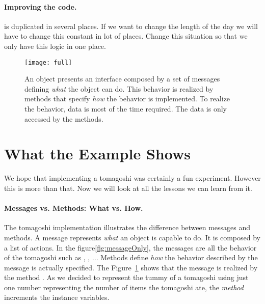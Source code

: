 \paragraph{Improving the code.}  is duplicated in several places. If we want to
 change the length of the day we will have to change this constant in lot of places. Change this
 situation so that we only have this logic in one place. 

\begin{figure}
\begin{center}
\texttt{[image: full]}
\caption{An object presents an interface composed by a set of messages defining \textit{what} the object can do. This behavior is realized by methods that specify \textit{how} the behavior is implemented. To realize the behavior, data is most of the time required. The data is only accessed by the methods. \label{fig:full}}
\end{center}
\end{figure}


\section{What the Example Shows}
We hope that implementing a tomagoshi was certainly a fun experiment. However this is more than that. Now we will look at all the lessons
we can learn from it. 


\paragraph{Messages vs. Methods: What vs. How.} The tomagoshi implementation illustrates the difference between messages and  methods. A message represents \textit{what} an object is capable to do. It is composed by a list of actions. 
In the figure\ref{fig:messageOnly}, the messages are all the behavior of the tomagoshi such as , , ... Methods define \textit{how} the behavior described by the message is actually specified. The Figure~\ref{fig:full} shows that the message  is realized by the method . As we decided to represent the tummy 
of a tomagoshi using just one number representing the number of items the tomagoshi ate, the \textit{method} 
increments the  instance variables. 




